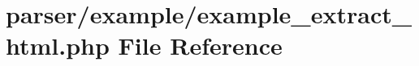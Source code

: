 \hypertarget{example__extract__html_8php}{\section{parser/example/example\+\_\+extract\+\_\+html.php File Reference}
\label{example__extract__html_8php}
}
